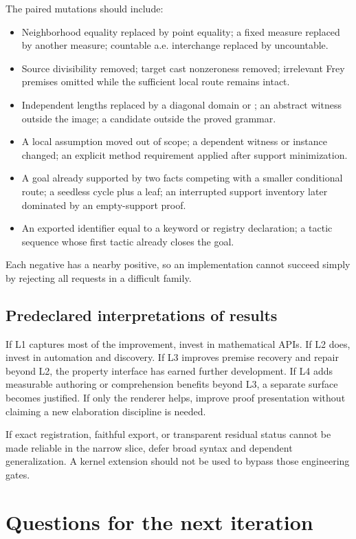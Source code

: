 \documentclass[11pt,letterpaper]{article}
\newcommand{\code}[1]{\texttt{\detokenize{#1}}}
\theoremstyle{definition}\newtheorem{definition}[proposition]{Definition}
\theoremstyle{remark}\newtheorem{remark}[proposition]{Remark}
\begin{document}
The paired mutations should include:
\begin{itemize}
\item Neighborhood equality replaced by point equality; a fixed measure
replaced by another measure; countable a.e. interchange replaced by uncountable.
\item Source divisibility removed; target cast nonzeroness removed; irrelevant
Frey premises omitted while the sufficient local route remains intact.
\item Independent lengths replaced by a diagonal domain or \code{List Empty};
an abstract witness outside the image; a candidate outside the proved grammar.
\item A local assumption moved out of scope; a dependent witness or instance
changed; an explicit method requirement applied after support minimization.
\item A goal already supported by two facts competing with a smaller conditional
route; a seedless cycle plus a leaf; an interrupted support inventory later
dominated by an empty-support proof.
\item An exported identifier equal to a keyword or registry declaration;
a tactic sequence whose first tactic already closes the goal.
\end{itemize}
Each negative has a nearby positive, so an implementation cannot succeed
simply by rejecting all requests in a difficult family.

\subsection{Predeclared interpretations of results}

If L1 captures most of the improvement, invest in mathematical APIs. If L2
does, invest in automation and discovery. If L3 improves premise recovery
and repair beyond L2, the property interface has earned further development.
If L4 adds measurable authoring or comprehension benefits beyond L3, a
separate surface becomes justified. If only the renderer helps, improve
proof presentation without claiming a new elaboration discipline is needed.

If exact registration, faithful export, or transparent residual status cannot
be made reliable in the narrow slice, defer broad syntax and dependent
generalization. A kernel extension should not be used to bypass those
engineering gates.

\section{Questions for the next iteration}
\label{sec:questions}
\end{document}
